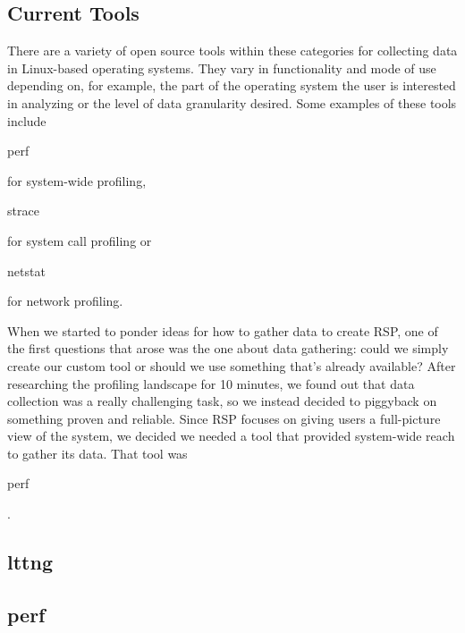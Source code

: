 \documentclass[10pt]{article}
\begin{document}
\subsection{Current Tools}

There are a variety of open source tools within these categories for collecting data in Linux-based operating systems. They vary in functionality and mode of use depending on, for example, the part of the operating system the user is interested in analyzing or the level of data granularity desired. Some examples of these tools include \begin{tt}perf\end{tt} for system-wide profiling, \begin{tt}strace\end{tt} for system call profiling or \begin{tt}netstat\end{tt} for network profiling.

When we started to ponder ideas for how to gather data to create RSP, one of the first questions that arose was the one about data gathering: could we simply create our custom tool or should we use something that's already available? After researching the profiling landscape for 10 minutes, we found out that data collection was a really challenging task, so we instead decided to piggyback on something proven and reliable. Since RSP focuses on giving users a full-picture view of the system, we decided we needed a tool that provided system-wide reach to gather its data. That tool was \begin{tt}perf\end{tt}.

\subsection{lttng}

\subsection{perf}
\end{document}
